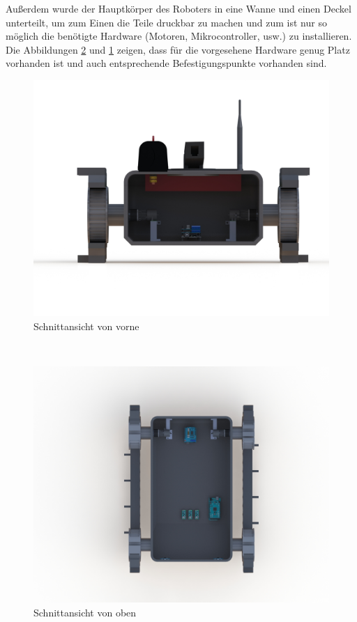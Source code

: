 Außerdem wurde der Hauptkörper des Roboters in eine Wanne und einen Deckel unterteilt, um zum Einen die Teile druckbar zu machen und zum ist nur so möglich die benötigte Hardware (Motoren, Mikrocontroller, usw.) zu installieren.  \\

Die Abbildungen \ref{fig:top} und \ref{fig:front} zeigen, dass für die vorgesehene Hardware genug Platz vorhanden ist und auch entsprechende Befestigungspunkte vorhanden sind.\\
\begin{figure}[h]
    \centering
    \captionsetup{width=.9\linewidth}
    \includegraphics[width=1\linewidth]{schnitt_front.JPG}
    \caption{Schnittansicht von vorne}
    \label{fig:front}
\end{figure}\\
\begin{figure}[h]
    \centering
    \captionsetup{width=.9\linewidth}
    \includegraphics[width=1\linewidth]{schnitt_top.JPG}
    \caption{Schnittansicht von oben}
    \label{fig:top}
\end{figure}\\
